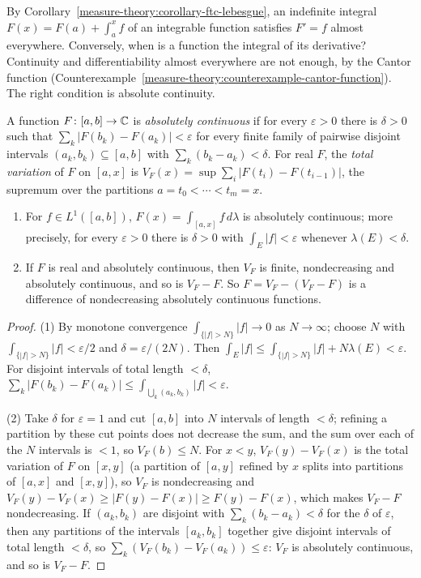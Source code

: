By Corollary~\ref{measure-theory:corollary-ftc-lebesgue}, an indefinite integral $F(x) = F(a) + \int_a^xf$ of an integrable function satisfies $F' = f$ almost everywhere.
Conversely, when is a function the integral of its derivative? Continuity and differentiability almost everywhere are not enough, by the Cantor function
(Counterexample~\ref{measure-theory:counterexample-cantor-function}). The right condition is absolute continuity.

\begin{definition}\label{measure-theory:definition-absolutely-continuous}
A function $F \colon [a, b] \to \mathbb{C}$ is \emph{absolutely continuous} if for every $\varepsilon > 0$ there is $\delta > 0$ such that $\sum_k|F(b_k) - F(a_k)| < \varepsilon$ for every finite
family of pairwise disjoint intervals $(a_k, b_k) \subseteq [a, b]$ with $\sum_k(b_k - a_k) < \delta$. For real $F$, the \emph{total variation} of $F$ on $[a, x]$ is
$V_F(x) = \sup\sum_i|F(t_i) - F(t_{i-1})|$, the supremum over the partitions $a = t_0 < \cdots < t_m = x$.
\end{definition}

\begin{lemma}\label{measure-theory:lemma-absolutely-continuous}
\begin{enumerate}
\item For $f \in L^1([a, b])$, $F(x) = \int_{[a,x]}f\,d\lambda$ is absolutely continuous; more precisely, for every $\varepsilon > 0$ there is $\delta > 0$ with $\int_E|f| < \varepsilon$
whenever $\lambda(E) < \delta$.
\item If $F$ is real and absolutely continuous, then $V_F$ is finite, nondecreasing and absolutely continuous, and so is $V_F - F$. So $F = V_F - (V_F - F)$ is a difference of
nondecreasing absolutely continuous functions.
\end{enumerate}
\end{lemma}

\begin{proof}
(1) By monotone convergence $\int_{\{|f| > N\}}|f| \to 0$ as $N \to \infty$; choose $N$ with $\int_{\{|f| > N\}}|f| < \varepsilon/2$ and $\delta = \varepsilon/(2N)$. Then
$\int_E|f| \leq \int_{\{|f| > N\}}|f| + N\lambda(E) < \varepsilon$. For disjoint intervals of total length $< \delta$, $\sum_k|F(b_k) - F(a_k)| \leq \int_{\bigcup_k(a_k, b_k)}|f| < \varepsilon$.

(2) Take $\delta$ for $\varepsilon = 1$ and cut $[a, b]$ into $N$ intervals of length $< \delta$; refining a partition by these cut points does not decrease the sum, and the sum
over each of the $N$ intervals is $< 1$, so $V_F(b) \leq N$. For $x < y$, $V_F(y) - V_F(x)$ is the total variation of $F$ on $[x, y]$ (a partition of $[a, y]$ refined by $x$ splits
into partitions of $[a, x]$ and $[x, y]$), so $V_F$ is nondecreasing and $V_F(y) - V_F(x) \geq |F(y) - F(x)| \geq F(y) - F(x)$, which makes $V_F - F$ nondecreasing. If
$(a_k, b_k)$ are disjoint with $\sum_k(b_k - a_k) < \delta$ for the $\delta$ of $\varepsilon$, then any partitions of the intervals $[a_k, b_k]$ together give disjoint intervals of total
length $< \delta$, so $\sum_k(V_F(b_k) - V_F(a_k)) \leq \varepsilon$: $V_F$ is absolutely continuous, and so is $V_F - F$.
\end{proof}

